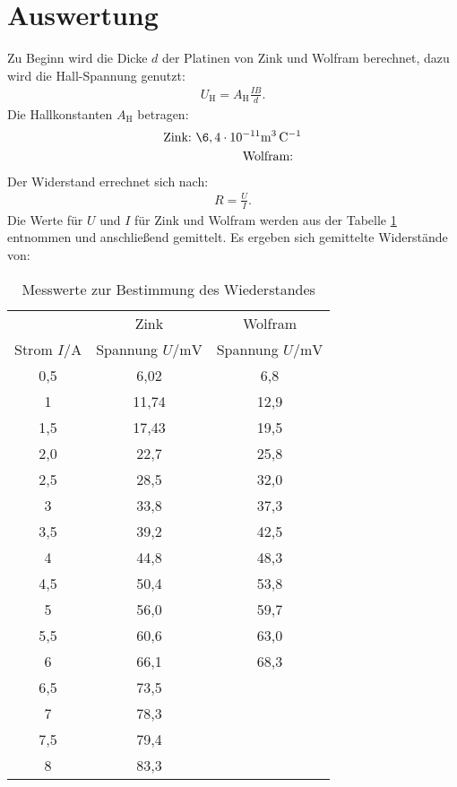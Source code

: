 \section{Auswertung}
\label{sec:Auswertung}
Zu Beginn wird die Dicke $d$ der Platinen von Zink und Wolfram berechnet, dazu wird die Hall-Spannung genutzt:
\begin{align}
U_\mathrm{H}=A_\mathrm{H}\frac{IB}{d}.
\end{align}
Die Hallkonstanten $A_\mathrm{H}$ betragen:
\begin{align*}
  \text{Zink:}\ \6,4\cdot 10^{-11} \si{\meter\tothe{3}\per\coulomb}\\
  \text{Wolfram:}\ \
\end{align*}
Der Widerstand errechnet sich nach:
\begin{align}
  R=\frac{U}{I}.
\end{align}
Die Werte für $U$ und $I$ für Zink und Wolfram werden aus der Tabelle \ref{tab:R} entnommen und anschließend gemittelt.
Es ergeben sich gemittelte Widerstände von:
\begin{table}
  \centering
  \caption{Messwerte zur Bestimmung des Wiederstandes }
  \label{tab:R}
  \begin{tabular}{c c c}
    \toprule
                       &     Zink                        & Wolfram\\
Strom $I/\si{\ampere}$ & Spannung $U/\si{\milli\volt}$  & Spannung $U/\si{\milli\volt}$ \\
    \midrule
    0,5   &  6,02  &  6,8\\
    1     &  11,74 &  12,9\\
    1,5   &  17,43 &  19,5\\
    2,0   &  22,7  &  25,8\\
    2,5   &  28,5  &  32,0\\
    3     &  33,8  &  37,3\\
    3,5   &  39,2  &  42,5\\
    4     &  44,8  &  48,3\\
    4,5   &  50,4  &  53,8\\
    5     &  56,0  &  59,7\\
    5,5   &  60,6  &  63,0\\
    6     &  66,1  &  68,3\\
    6,5   &  73,5  &\\
    7     &  78,3  &\\
    7,5   &  79,4  &\\
    8     &  83,3  &\\
   \bottomrule
  \end{tabular}
\end{table}

